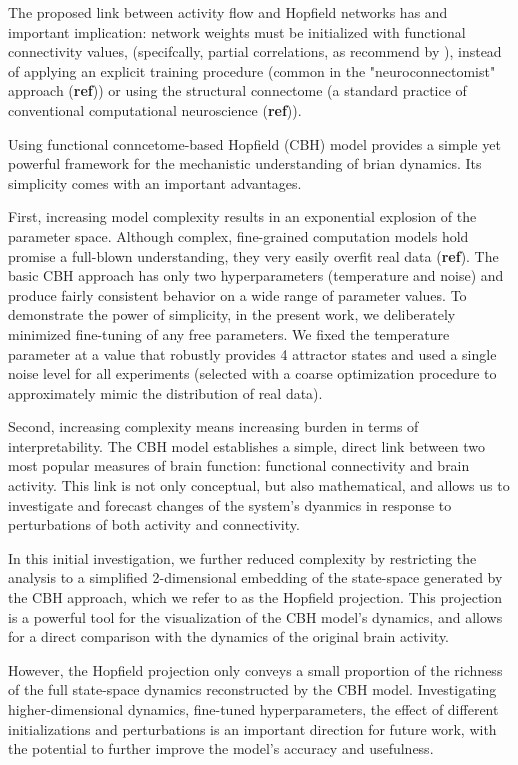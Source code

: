 \documentclass{article}
\begin{document}
The proposed link between activity flow and Hopfield networks has and important implication: network weights must be initialized with functional connectivity values, (specifcally, partial correlations, as recommend by \cite{Cole_2016}), instead of applying an explicit training procedure (common in the "neuroconnectomist" approach (\textbf{ref})) or using the structural connectome (a standard practice of conventional computational neuroscience (\textbf{ref})).

Using functional conncetome-based Hopfield (CBH) model provides a simple yet powerful framework for the mechanistic understanding of brian dynamics. Its simplicity comes with an important advantages.

First, increasing model complexity results in an exponential explosion of the parameter space. Although complex, fine-grained computation models hold promise a full-blown understanding, they very easily overfit real data (\textbf{ref}). The basic CBH approach has only two hyperparameters (temperature and noise) and produce fairly consistent behavior on a wide range of parameter values. To demonstrate the power of simplicity, in the present work, we deliberately minimized fine-tuning of any free parameters. We fixed the temperature parameter at a value that robustly provides 4 attractor states and used a single noise level for all experiments (selected with a coarse optimization procedure to approximately mimic the distribution of real data).

Second, increasing complexity means increasing burden in terms of interpretability. The CBH model establishes a simple, direct link between two most popular measures of brain function: functional connectivity and brain activity. This link is not only conceptual, but also mathematical, and allows us to investigate and forecast changes of the system's dyanmics in response to perturbations of both activity and connectivity.

In this initial investigation, we further reduced complexity by restricting the analysis to a simplified 2-dimensional embedding of the state-space generated by the CBH approach, which we refer to as the Hopfield projection. This projection is a powerful tool for the visualization of the CBH model's dynamics, and allows for a direct comparison with the dynamics of the original brain activity.

However, the Hopfield projection only conveys a small proportion of the richness of the full state-space dynamics reconstructed by the CBH model.
Investigating higher-dimensional dynamics, fine-tuned hyperparameters, the effect of different initializations and perturbations is an important direction for future work, with the potential to further improve the model's accuracy and usefulness.
\end{document}
